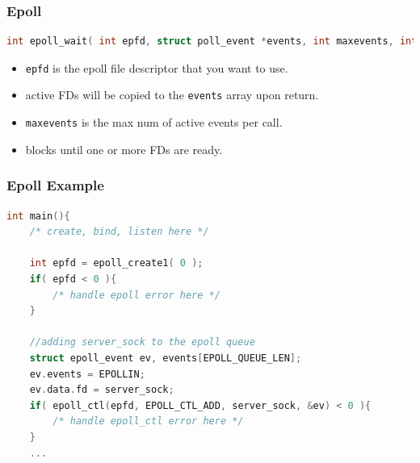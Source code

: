 \documentclass[aspectratio=43]{beamer}
\begin{document}
\begin{frame}[fragile]
  \frametitle{Epoll}
    \begin{lstlisting}[language=C++,basicstyle=\ttfamily\footnotesize,commentstyle=\color{commgreen},keywordstyle=\color{blue},breaklines=true]
int epoll_wait( int epfd, struct poll_event *events, int maxevents, int timeout );
\end{lstlisting}

\begin{itemize}
\item {\tt epfd} is the epoll file descriptor that you want to use.
\item active FDs will be copied to the {\tt events} array upon return.
\item {\tt maxevents} is the max num of active events per call.
\item blocks until one or more FDs are ready.
\end{itemize}
\end{frame}

\begin{frame}[fragile]
  \frametitle{Epoll Example}
\begin{lstlisting}[language=C++,basicstyle=\ttfamily\footnotesize,commentstyle=\color{commgreen},keywordstyle=\color{blue},breaklines=true]
int main(){
    /* create, bind, listen here */
    
    int epfd = epoll_create1( 0 );
    if( epfd < 0 ){
        /* handle epoll error here */
    }

    //adding server_sock to the epoll queue
    struct epoll_event ev, events[EPOLL_QUEUE_LEN];
    ev.events = EPOLLIN;
    ev.data.fd = server_sock;
    if( epoll_ctl(epfd, EPOLL_CTL_ADD, server_sock, &ev) < 0 ){
        /* handle epoll_ctl error here */
    }
    ...
   \end{lstlisting}
\end{frame}
\end{document}
